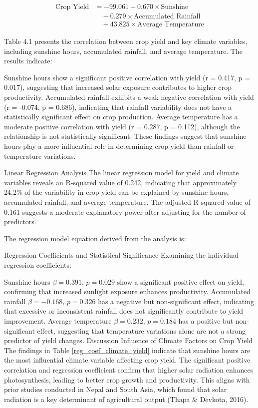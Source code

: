 \begin{equation}
    \begin{split}
        \text{Crop Yield} &= -99.061 + 0.670 \times \text{Sunshine} \\
        &\quad - 0.279 \times \text{Accumulated Rainfall} \\
        &\quad + 43.825 \times \text{Average Temperature}
    \end{split}
\end{equation}



Table 4.1 presents the correlation between crop yield and key climate variables, including sunshine hours, accumulated rainfall, and average temperature. The results indicate:

Sunshine hours show a significant positive correlation with yield (r = 0.417, p = 0.017), suggesting that increased solar exposure contributes to higher crop productivity.
Accumulated rainfall exhibits a weak negative correlation with yield (r = -0.074, p = 0.686), indicating that rainfall variability does not have a statistically significant effect on crop production.
Average temperature has a moderate positive correlation with yield (r = 0.287, p = 0.112), although the relationship is not statistically significant.
These findings suggest that sunshine hours play a more influential role in determining crop yield than rainfall or temperature variations.

Linear Regression Analysis
The linear regression model for yield and climate variables reveals an R-squared value of 0.242, indicating that approximately 24.2\% of the variability in crop yield can be explained by sunshine hours, accumulated rainfall, and average temperature. The adjusted R-squared value of 0.161 suggests a moderate explanatory power after adjusting for the number of predictors.

The regression model equation derived from the analysis is:


Regression Coefficients and Statistical Significance
Examining the individual regression coefficients:

Sunshine hours \(\beta = 0.391, \, p = 0.029\) show a significant positive effect on yield, confirming that increased sunlight exposure enhances productivity.
Accumulated rainfall \(\beta = -0.168, \, p = 0.326\) has a negative but non-significant effect, indicating that excessive or inconsistent rainfall does not significantly contribute to yield improvement.
Average temperature \(\beta = 0.232, \, p = 0.184\) has a positive but non-significant effect, suggesting that temperature variations alone are not a strong predictor of yield changes.
Discussion
Influence of Climate Factors on Crop Yield
The findings in Table \ref{reg_coef_climate_yield} indicate that sunshine hours are the most influential climate variable affecting crop yield. The significant positive correlation and regression coefficient confirm that higher solar radiation enhances photosynthesis, leading to better crop growth and productivity. This aligns with prior studies conducted in Nepal and South Asia, which found that solar radiation is a key determinant of agricultural output (Thapa \& Devkota, 2016).

